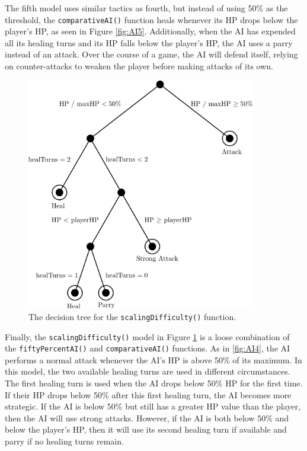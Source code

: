 The fifth model uses similar tactics as fourth, but instead of using 50\% as the threshold, the \texttt{comparativeAI()} function heals whenever its HP drops below the player's HP, as seen in Figure \ref{fig:AI5}. Additionally, when the AI has expended all its healing turns and its HP falls below the player's HP, the AI uses a parry instead of an attack. Over the course of a game, the AI will defend itself, relying on counter-attacks to weaken the player before making attacks of its own.

\begin{figure}[H]
  \centering
  \includegraphics[width=10cm]{figures/AIScaling.png}
  \caption{The decision tree for the \texttt{scalingDifficulty()} function.}
  \label{fig:AI6}
\end{figure}

Finally, the \texttt{scalingDifficulty()} model in Figure \ref{fig:AI6} is a loose combination of the \texttt{fiftyPercentAI()} and \texttt{comparativeAI()} functions. As in \ref{fig:AI4}, the AI performs a normal attack whenever the AI's HP is above 50\% of its maximum. In this model, the two available healing turns are used in different circumstances. The first healing turn is used when the AI drops below 50\% HP for the first time. If their HP drops below 50\% after this first healing turn, the AI becomes more strategic. If the AI is below 50\% but still has a greater HP value than the player, then the AI will use strong attacks. However, if the AI is both below 50\% and below the player's HP, then it will use its second healing turn if available and parry if no healing turns remain.\\

